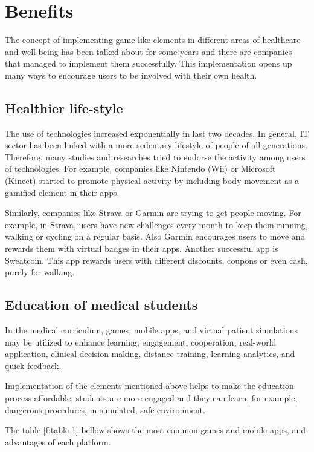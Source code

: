 \documentclass[10pt,twoside,english,a4paper]{article}
\begin{document}
%
%
%

\section{Benefits} \label{benefits}
The concept of implementing game-like elements in different areas of healthcare and well being has been talked about for some years and there are companies that managed to implement them successfully. This implementation opens up many ways to encourage users to be involved with their own health.  

\subsection{Healthier life-style } \label{lifestyle}
The use of technologies increased exponentially in last two decades. In general, IT sector has been linked with a more sedentary lifestyle of people of all generations. Therefore, many studies and researches tried to endorse the activity among users of technologies\cite{GONZALEZ2016529}. For example, companies like Nintendo (Wii) or Microsoft (Kinect) started to promote physical activity by including body movement as a gamified element in their apps.

Similarly, companies like Strava or Garmin are trying to get people moving. For example, in Strava, users have new challenges every month to keep them running, walking or cycling on a regular basis. Also Garmin encourages users to move and rewards them with virtual badges in their apps. Another successful app is Sweatcoin. This app rewards users with different discounts, coupons or even cash, purely for walking.

\subsection{Education of medical students} \label{stuff}
In the medical curriculum, games, mobile apps, and virtual patient simulations may be utilized to enhance learning, engagement, cooperation, real-world application, clinical decision making, distance training, learning analytics, and quick feedback\cite {https://doi.org/10.1002/ca.23916}.

Implementation of the elements mentioned above helps to make the education process affordable, students are more engaged and they can learn, for example, dangerous procedures, in simulated, safe  environment.

The table \ref{f:table 1} bellow shows the most common games and mobile apps, and advantages of each platform\cite{https://doi.org/10.1002/ca.23916}.
\end{document}
